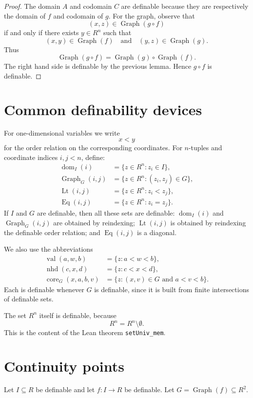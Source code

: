 \documentclass[11pt]{article}
\newcommand{\Graph}{\operatorname{Graph}}
\newcommand{\dom}{\operatorname{dom}}
\newcommand{\val}{\operatorname{val}}
\newcommand{\nhd}{\operatorname{nhd}}
\newcommand{\core}{\operatorname{core}}
\begin{document}
\begin{proof}
The domain $A$ and codomain $C$ are definable because they are respectively the domain of $f$ and codomain of $g$. For the graph, observe that
\[
  (x,z)\in\Graph(g\circ f)
\]
if and only if there exists $y\in R^n$ such that
\[
  (x,y)\in\Graph(f)
  \quad\text{and}\quad
  (y,z)\in\Graph(g).
\]
Thus
\[
  \Graph(g\circ f)=\Graph(g)\circ\Graph(f).
\]
The right hand side is definable by the previous lemma. Hence $g\circ f$ is definable.
\end{proof}

\section{Common definability devices}

For one-dimensional variables we write
\[
  x<y
\]
for the order relation on the corresponding coordinates.
For $n$-tuples and coordinate indices $i,j<n$, define:
\begin{align*}
  \dom_I(i) &= \{z\in R^n:z_i\in I\},\\
  \Graph_G(i,j) &= \{z\in R^n:(z_i,z_j)\in G\},\\
  \operatorname{Lt}(i,j) &= \{z\in R^n:z_i<z_j\},\\
  \operatorname{Eq}(i,j) &= \{z\in R^n:z_i=z_j\}.
\end{align*}
If $I$ and $G$ are definable, then all these sets are definable: $\dom_I(i)$ and $\Graph_G(i,j)$ are obtained by reindexing; $\operatorname{Lt}(i,j)$ is obtained by reindexing the definable order relation; and $\operatorname{Eq}(i,j)$ is a diagonal.

We also use the abbreviations
\begin{align*}
  \val(a,w,b) &= \{z:a<w<b\},\\
  \nhd(c,x,d) &= \{z:c<x<d\},\\
  \core_G(x,a,b,v) &= \{z:(x,v)\in G\text{ and }a<v<b\}.
\end{align*}
Each is definable whenever $G$ is definable, since it is built from finite intersections of definable sets.

The set $R^n$ itself is definable, because
\[
  R^n=R^n\setminus\emptyset.
\]
This is the content of the Lean theorem \texttt{setUniv\_mem}.

\section{Continuity points}

Let $I\subseteq R$ be definable and let $f:I\to R$ be definable. Let $G=\Graph(f)\subseteq R^2$.
\end{document}
